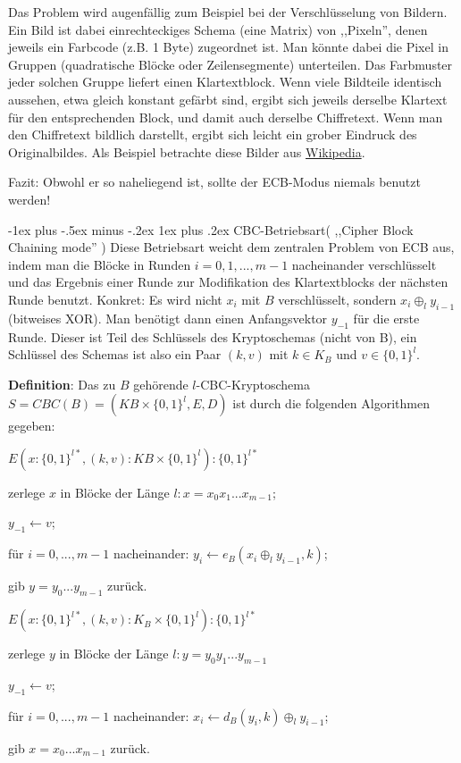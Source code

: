 \documentclass[a4paper]{article}
\makeatletter
\renewcommand{\subsubsection}{\@startsection{subsubsection}{3}{0mm}%
 {-1ex plus -.5ex minus -.2ex}%
 {1ex plus .2ex}%
 {\normalfont\small\bfseries}}
\makeatother
\begin{document}
\begin{multicols}{3}
    Das Problem wird augenfällig zum Beispiel bei der Verschlüsselung von Bildern. Ein Bild ist dabei einrechteckiges Schema (eine Matrix) von ,,Pixeln'', denen jeweils ein Farbcode (z.B. 1 Byte) zugeordnet ist. Man könnte dabei die Pixel in Gruppen (quadratische Blöcke oder Zeilensegmente) unterteilen. Das Farbmuster jeder solchen Gruppe liefert einen Klartextblock. Wenn viele Bildteile identisch aussehen, etwa gleich konstant gefärbt sind, ergibt sich jeweils derselbe Klartext für den entsprechenden Block, und damit auch derselbe Chiffretext. Wenn man den Chiffretext bildlich darstellt, ergibt sich leicht ein grober Eindruck des Originalbildes. Als Beispiel betrachte diese Bilder aus \href{https://de.wikipedia.org/wiki/Electronic_Code_Book_Mode}{Wikipedia}.

    Fazit: Obwohl er so naheliegend ist, sollte der ECB-Modus niemals benutzt werden!

    \subsubsection{CBC-Betriebsart( ,,Cipher Block Chaining mode'' )}
    Diese Betriebsart weicht dem zentralen Problem von ECB aus, indem man die Blöcke in Runden $i=0, 1 ,...,m-1$ nacheinander verschlüsselt und das Ergebnis einer Runde zur Modifikation des Klartextblocks der nächsten Runde benutzt. Konkret: Es wird nicht $x_i$ mit $B$ verschlüsselt, sondern $x_i\oplus_l y_{i-1}$ (bitweises XOR). Man benötigt dann einen Anfangsvektor $y_{-1}$ für die erste Runde. Dieser ist Teil des Schlüssels des Kryptoschemas (nicht von B), ein Schlüssel des Schemas ist also ein Paar $(k,v)$ mit $k\in K_B$ und $v\in\{0,1\}^l$.

    \textbf{Definition}: Das zu $B$ gehörende $l$-CBC-Kryptoschema $S=CBC(B)=(KB\times\{0,1\}^l,E,D)$ ist durch die folgenden Algorithmen gegeben:
    \begin{itemize*}
        \item $E(x:\{0,1\}^{l*},(k,v) :KB\times\{0,1\}^l) :\{0,1\}^{l*}$
        \item zerlege $x$ in Blöcke der Länge $l:x=x_0 x_1 ...x_{m-1}$;
        \item $y_{-1} \leftarrow v$;
        \item für $i= 0,...,m-1$ nacheinander: $y_i\leftarrow e_B(x_i\oplus_l y_{i-1},k)$;
        \item gib $y=y_0 ...y_{m-1}$ zurück.
        \item $E(x:\{0,1\}^{l*},(k,v) :K_B\times\{0,1\}^l) :\{0,1\}^{l*}$
        \item zerlege $y$ in Blöcke der Länge $l:y=y_0 y_1 ...y_{m-1}$
        \item $y_{-1} \leftarrow v$;
        \item für $i=0,...,m-1$ nacheinander: $x_i\leftarrow d_B(y_i,k)\oplus_l y_{i-1}$;
        \item gib $x=x_0 ...x_{m-1}$ zurück.
    \end{itemize*}


\end{multicols}
\end{document}
